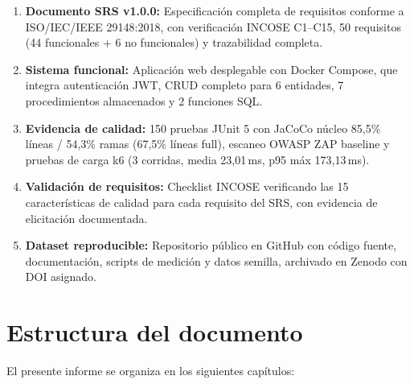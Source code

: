 \begin{enumerate}
  \item \textbf{Documento SRS v1.0.0:} Especificación completa de requisitos conforme a ISO/IEC/IEEE 29148:2018, con verificación INCOSE C1--C15, 50 requisitos (44 funcionales + 6 no funcionales) y trazabilidad completa.

  \item \textbf{Sistema funcional:} Aplicación web desplegable con Docker Compose, que integra autenticación JWT, CRUD completo para 6 entidades, 7 procedimientos almacenados y 2 funciones SQL.

  \item \textbf{Evidencia de calidad:} 150 pruebas JUnit 5 con JaCoCo núcleo 85,5\% líneas / 54,3\% ramas (67,5\% líneas full), escaneo OWASP ZAP baseline y pruebas de carga k6 (3 corridas, media 23,01\,ms, p95 máx 173,13\,ms).

  \item \textbf{Validación de requisitos:} Checklist INCOSE verificando las 15 características de calidad para cada requisito del SRS, con evidencia de elicitación documentada.

  \item \textbf{Dataset reproducible:} Repositorio público en GitHub con código fuente, documentación, scripts de medición y datos semilla, archivado en Zenodo con DOI asignado.
\end{enumerate}

\section{Estructura del documento}
\label{sec:estructura}

El presente informe se organiza en los siguientes capítulos:


